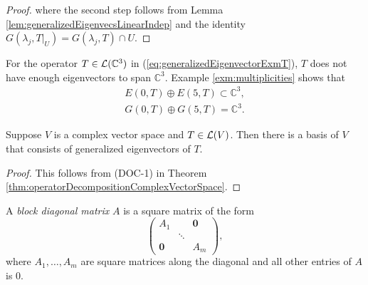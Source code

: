 \begin{proof}
  where the second step follows from Lemma
  \ref{lem:generalizedEigenvecsLinearIndep} and the identity
  $G(\lambda_j,T|_U) = G(\lambda_j, T) \cap U$.
\end{proof}

\begin{exm}
  For the operator $T\in {\cal L}(\mathbb{C}^3)$ in
  (\ref{eq:generalizedEigenvectorExmT}),
  $T$ does not have enough eigenvectors to span
  $\mathbb{C}^3$.
  Example \ref{exm:multiplicities} shows that
  \begin{displaymath}
    \begin{array}{l}
      E(0,T)\oplus E(5,T) \subset \mathbb{C}^3,\\
      G(0,T)\oplus G(5,T) = \mathbb{C}^3.
    \end{array}
  \end{displaymath}
\end{exm}

\begin{coro}
  \label{coro:basisAsGeneralizedEigenvectors}
  Suppose $V$ is a complex vector space and
  $T\in {\cal L}(V)$.
  Then there is a basis of $V$
  that consists of generalized eigenvectors of $T$.
\end{coro}
\begin{proof}
  This follows from (DOC-1)
  in Theorem \ref{thm:operatorDecompositionComplexVectorSpace}.
\end{proof}

\begin{defn}
  A \emph{block diagonal matrix} $A$ is a square matrix of the form
  \begin{equation}
    \label{eq:blockDiagonal}
    \begin{pmatrix}
      A_1& & \mathbf{0}
      \\
      & \ddots &
      \\
      \mathbf{0} & & A_m
    \end{pmatrix},
  \end{equation}
  where $A_1, \ldots, A_m$ are square matrices along the diagonal
  and all other entries of $A$ is 0.
\end{defn}

